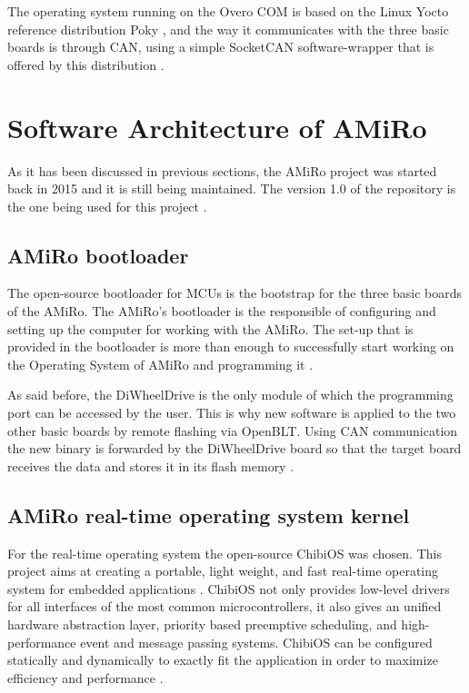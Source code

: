 \documentclass[12pt]{report}%
\begin{document}
The operating system running on the Overo COM is based on the Linux Yocto reference distribution Poky \cite{poky}, and the way it communicates with the three basic boards is through CAN, using a simple SocketCAN software-wrapper that is offered by this distribution \cite{AMiRo_paper_modular}.

\section{Software Architecture of AMiRo}
\label{sec:soft}
As it has been discussed in previous sections, the AMiRo project was started back in 2015 and it is still being maintained. The version 1.0 of the repository is the one being used for this project \cite{AMiRo_Git}.

\subsection{AMiRo bootloader}
\label{sub:btl}
The open-source bootloader for MCUs is the bootstrap for the three basic boards of the AMiRo. The AMiRo's bootloader is the responsible of configuring and setting up the computer for working with the AMiRo. The set-up that is provided in the bootloader is more than enough to successfully start working on the Operating System of AMiRo and programming it \cite{btl}.

As said before, the DiWheelDrive is the only module of which the programming port can be accessed by the user. This is why new software is applied to the two other basic boards by remote flashing via OpenBLT. Using CAN communication the new binary is forwarded by the DiWheelDrive board so that the target board receives the data and stores it in its flash memory \cite{AMiRo_paper_modular}.

\subsection{AMiRo real-time operating system kernel}
For the real-time operating system the open-source ChibiOS was chosen. This project aims at creating a portable, light weight, and fast real-time operating system for embedded applications \cite{chibioshp}. ChibiOS not only provides low-level drivers for all interfaces of the most common microcontrollers, it also gives an unified hardware abstraction layer, priority based preemptive scheduling, and high-performance event and message passing systems. ChibiOS can be configured statically and dynamically to exactly fit the application in order to maximize efficiency and performance \cite{AMiRo_paper_modular}.
\end{document}
